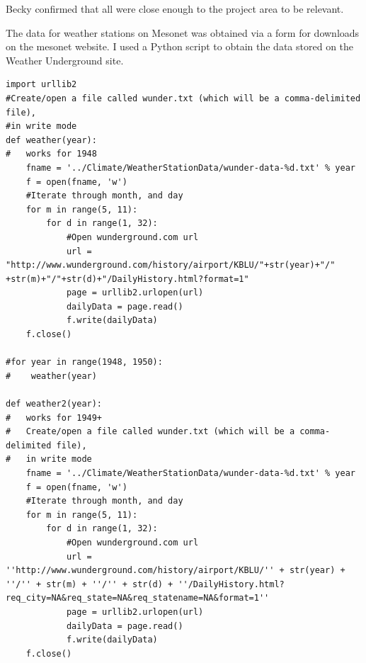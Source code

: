 Becky confirmed that all were close enough to the project area to be relevant.

The data for weather stations on Mesonet was obtained via a form for downloads on the mesonet website. I used a Python script to obtain the data stored on the Weather Underground site.
\begin{lstlisting}
import urllib2
#Create/open a file called wunder.txt (which will be a comma-delimited file), 
#in write mode
def weather(year):
#   works for 1948
    fname = '../Climate/WeatherStationData/wunder-data-%d.txt' % year
    f = open(fname, 'w')
    #Iterate through month, and day
    for m in range(5, 11):
        for d in range(1, 32):
            #Open wunderground.com url
            url = "http://www.wunderground.com/history/airport/KBLU/"+str(year)+"/" +str(m)+"/"+str(d)+"/DailyHistory.html?format=1"
            page = urllib2.urlopen(url)
            dailyData = page.read()
            f.write(dailyData)
    f.close()                            

#for year in range(1948, 1950):
#    weather(year)

def weather2(year):
#   works for 1949+
#   Create/open a file called wunder.txt (which will be a comma-delimited file), 
#   in write mode
    fname = '../Climate/WeatherStationData/wunder-data-%d.txt' % year
    f = open(fname, 'w')
    #Iterate through month, and day
    for m in range(5, 11):
        for d in range(1, 32):
            #Open wunderground.com url
            url = ''http://www.wunderground.com/history/airport/KBLU/'' + str(year) + ''/'' + str(m) + ''/'' + str(d) + ''/DailyHistory.html?req_city=NA&req_state=NA&req_statename=NA&format=1''
            page = urllib2.urlopen(url)
            dailyData = page.read()
            f.write(dailyData)
    f.close() 
\end{lstlisting}

